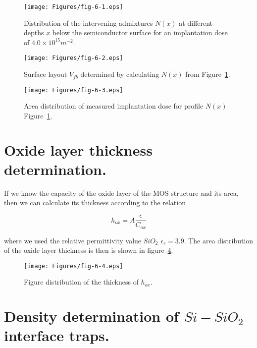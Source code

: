 \begin{figure}[h!]\centering
  \texttt{[image: Figures/fig-6-1.eps]}%
  \caption[The distribution of tangents $N(x)$ at different depths
    $x$]{Distribution of the intervening admixtures $N(x)$ at
    different depths $x$ below the semiconductor surface for an
    implantation dose of $4.0 \times 10^{15}m^{-2}$.}\label{fig:6.1}
\end{figure}

\begin{figure}[h!]\centering
  \texttt{[image: Figures/fig-6-2.eps]}
  \caption[Surface layout $V_{fb}$]{Surface layout $V_{fb}$ determined
    by calculating $N(x)$ from Figure~\ref{fig:6.1}.}\label{fig:6.2}
\end{figure}

\begin{figure}[h!]\centering
  \texttt{[image: Figures/fig-6-3.eps]}
  \caption[Area distribution of measured implantation dose]{Area
    distribution of measured implantation dose for profile $N(x)$
    Figure~\ref{fig:6.1}.}\label{fig:6.3}
\end{figure}

\section{Oxide layer thickness determination.}\label{sec:6.2}

If we know the capacity of the oxide layer of the MOS structure and
its area, then we can calculate its thickness according to the
relation

\begin{equation}\label{eq:6.3}
  h_{ox} = A \frac{\epsilon}{C_{ox}}
\end{equation}

where we used the relative permittivity value $SiO_{2}$
$\epsilon_{r}=3.9$. The area distribution of the oxide layer thickness
is then is shown in figure~\ref{fig:6.4}.

\begin{figure}[h!]\centering
  \texttt{[image: Figures/fig-6-4.eps]}
  \caption[Plane distribution of the thickness of the $h_{ox}$]{Figure
    distribution of the thickness of $h_{ox}$.}\label{fig:6.4}
\end{figure}

\section{Density determination of $Si-SiO_{2}$ interface traps.}\label{sec:6.3}

